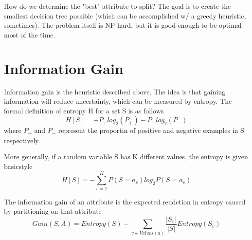 How do we determine the "best" attribute to split? The goal is to create the smallest decision tree possible (which can be accomplished w/ a greedy heuristic, sometimes). The problem itself is NP-hard, but it is good enough to be optimal most of the time. 

\section{Information Gain}
Information gain is the heuristic described above. The idea is that gaining information will reduce uncertainty, which can be measured by entropy. The formal definition of entropy H for a set S is as follows
\[
    H[S]   = -P_+log_2(P_+) - P_-log_2(P_-)
\]
where $P_+$ and $P_-$ represent the proportin of positive and negative examples in S respectively.

More generally, if a random variable S has K different values, the entropy is given basicstyle
\[
    H[S] = - \sum_{v=1}^{K}P(S=a_v)log_2P(S=a_v)
\]

The information gain of an attribute is the expected reudction in entropy caused by partitioning on that attribute
\[
    Gain(S,A) = Entropy(S) - \sum_{v \in Values(a)}\frac{|S_v|}{|S|}Entropy(S_v)
\]